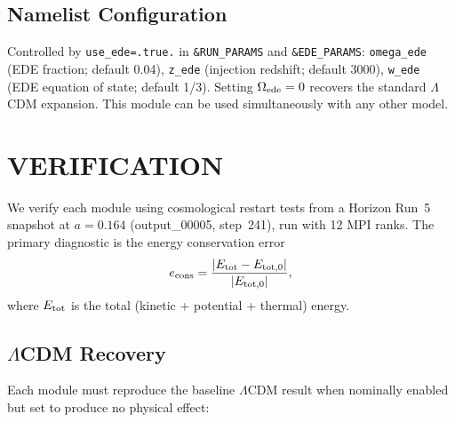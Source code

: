 \documentclass[fleqn,usenatbib]{mnras}
\newcommand{\code}[1]{\texttt{#1}}
\newcommand{\Oede}{\Omega_{\rm ede}}
\begin{document}
\subsection{Namelist Configuration}

Controlled by \code{use\_ede=.true.} in \code{\&RUN\_PARAMS} and
\code{\&EDE\_PARAMS}:
\code{omega\_ede} (EDE fraction; default 0.04),
\code{z\_ede} (injection redshift; default 3000),
\code{w\_ede} (EDE equation of state; default 1/3).
Setting $\Oede = 0$ recovers the standard $\Lambda$CDM expansion.
This module can be used simultaneously with any other model.


\section{VERIFICATION}
\label{sec:verification}

We verify each module using cosmological restart tests from a
Horizon Run~5 \citep{Lee2021} snapshot at $a = 0.164$ (output\_00005,
step~241), run with 12 MPI ranks.  The primary diagnostic is the
energy conservation error
\begin{equation}
e_{\rm cons} = \frac{|E_{\rm tot} - E_{\rm tot,0}|}{|E_{\rm tot,0}|},
\label{eq:econs}
\end{equation}
where $E_{\rm tot}$ is the total (kinetic + potential + thermal)
energy.

\subsection{$\Lambda$CDM Recovery}
\label{sec:verify_lcdm}

Each module must reproduce the baseline $\Lambda$CDM result when
nominally enabled but set to produce no physical effect:
\end{document}
